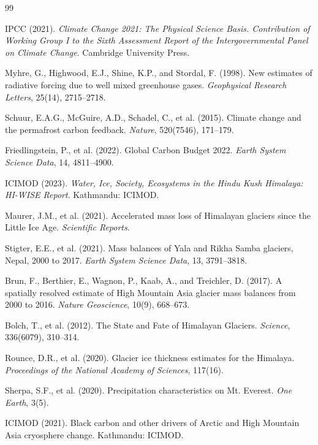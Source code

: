 \documentclass[12pt, a4paper]{article}
\begin{document}
\begin{thebibliography}{99}

 IPCC (2021). \textit{Climate Change 2021: The Physical Science Basis. Contribution of Working Group I to the Sixth Assessment Report of the Intergovernmental Panel on Climate Change}. Cambridge University Press.

 Myhre, G., Highwood, E.J., Shine, K.P., and Stordal, F. (1998). New estimates of radiative forcing due to well mixed greenhouse gases. \textit{Geophysical Research Letters}, 25(14), 2715--2718.

 Schuur, E.A.G., McGuire, A.D., Schadel, C., et al. (2015). Climate change and the permafrost carbon feedback. \textit{Nature}, 520(7546), 171--179.

 Friedlingstein, P., et al. (2022). Global Carbon Budget 2022. \textit{Earth System Science Data}, 14, 4811--4900.

 ICIMOD (2023). \textit{Water, Ice, Society, Ecosystems in the Hindu Kush Himalaya: HI-WISE Report}. Kathmandu: ICIMOD.

 Maurer, J.M., et al. (2021). Accelerated mass loss of Himalayan glaciers since the Little Ice Age. \textit{Scientific Reports}.

 Stigter, E.E., et al. (2021). Mass balances of Yala and Rikha Samba glaciers, Nepal, 2000 to 2017. \textit{Earth System Science Data}, 13, 3791--3818.

 Brun, F., Berthier, E., Wagnon, P., Kaab, A., and Treichler, D. (2017). A spatially resolved estimate of High Mountain Asia glacier mass balances from 2000 to 2016. \textit{Nature Geoscience}, 10(9), 668--673.

 Bolch, T., et al. (2012). The State and Fate of Himalayan Glaciers. \textit{Science}, 336(6079), 310--314.

 Rounce, D.R., et al. (2020). Glacier ice thickness estimates for the Himalaya. \textit{Proceedings of the National Academy of Sciences}, 117(16).

 Sherpa, S.F., et al. (2020). Precipitation characteristics on Mt. Everest. \textit{One Earth}, 3(5).

 ICIMOD (2021). Black carbon and other drivers of Arctic and High Mountain Asia cryosphere change. Kathmandu: ICIMOD.


\end{thebibliography}
\end{document}
